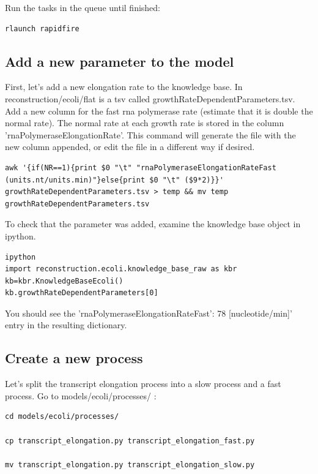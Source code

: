 \documentclass[12pt]{article}
\begin{document}
Run the tasks in the queue until finished:

\begin{lstlisting}
rlaunch rapidfire
\end{lstlisting}



\subsection{Add a new parameter to the model}

First, let’s add a new elongation rate to the knowledge base. In reconstruction/ecoli/flat is a tsv called growthRateDependentParameters.tsv. Add a new column for the fast rna polymerase rate (estimate that it is double the normal rate). The normal rate at each growth rate is stored in the column 'rnaPolymeraseElongationRate'. This command will generate the file with the new column appended, or edit the file in a different way if desired.

\pagebreak

\begin{lstlisting}
awk '{if(NR==1){print $0 "\t" "rnaPolymeraseElongationRateFast (units.nt/units.min)"}else{print $0 "\t" ($9*2)}}' growthRateDependentParameters.tsv > temp && mv temp growthRateDependentParameters.tsv  
\end{lstlisting}

To check that the parameter was added, examine the knowledge base object in ipython.

\lstset{language=Python}
\begin{lstlisting}
ipython
import reconstruction.ecoli.knowledge_base_raw as kbr
kb=kbr.KnowledgeBaseEcoli()
kb.growthRateDependentParameters[0]
\end{lstlisting}

You should see the 'rnaPolymeraseElongationRateFast': 78 [nucleotide/min]' entry in the resulting dictionary.

\subsection{Create a new process}

Let’s split the transcript elongation process into a slow process and a fast process. Go to models/ecoli/processes/ :

\lstset{language=bash}
\begin{lstlisting}
cd models/ecoli/processes/

cp transcript_elongation.py transcript_elongation_fast.py

mv transcript_elongation.py transcript_elongation_slow.py
\end{lstlisting}
\end{document}
